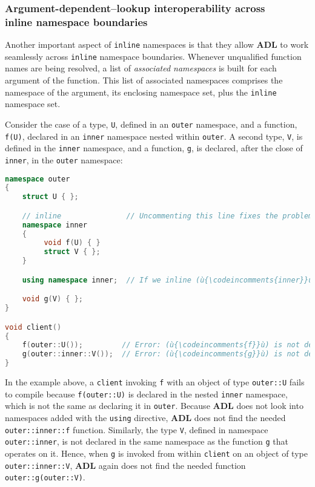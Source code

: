 \subsubsection[Argument-dependent–lookup interoperability across {\tt inline} {\tt namespace} boundaries]{Argument-dependent–lookup interoperability across\\[0.5ex] {\SubsubsecCode inline} {\SubsubsecCode namespace} boundaries}\label{argument-dependent–lookup-interoperability-across-inline-namespace-boundaries}

Another important aspect of \texttt{inline} namespaces is that they
allow \textbf{ADL} to work seamlessly across \texttt{inline} namespace
boundaries. Whenever unqualified function names are being resolved, a
list of \emph{associated namespaces} is built for each argument of the
function. This list of associated namespaces comprises the namespace of the
argument, its enclosing namespace set, plus the \texttt{inline}
namespace set.

Consider the case of a type, \texttt{U}, defined in an \texttt{outer}
namespace, and a function, \texttt{f(U)}, declared in an \texttt{inner}
namespace nested within \texttt{outer}. A second type, \texttt{V}, is
defined in the \texttt{inner} namespace, and a function, \texttt{g}, is
declared, after the close of \texttt{inner}, in the \texttt{outer}
namespace:

\begin{lstlisting}[language=C++]
namespace outer
{
    struct U { };

    // inline               // Uncommenting this line fixes the problem.
    namespace inner
    {
         void f(U) { }
         struct V { };
    }

    using namespace inner;  // If we inline (ù{\codeincomments{inner}}ù), we don't need this line.

    void g(V) { };
}

void client()
{
    f(outer::U());         // Error: (ù{\codeincomments{f}}ù) is not declared in this scope.
    g(outer::inner::V());  // Error: (ù{\codeincomments{g}}ù) is not declared in this scope.
}
\end{lstlisting}

\noindent In the example above, a \texttt{client} invoking \texttt{f} with an
object of type \texttt{outer::U} fails to compile because
\texttt{f(outer::U)} is declared in the nested \texttt{inner} namespace,
which is not the same as declaring it in \texttt{outer}. Because
\textbf{ADL} does not look into namespaces added with the \texttt{using}
directive, \textbf{ADL} does not find the needed
\texttt{outer::inner::f} function. Similarly, the type \texttt{V},
defined in namespace \texttt{outer::inner}, is not declared in the same
namespace as the function \texttt{g} that operates on it. Hence, when
\texttt{g} is invoked from within \texttt{client} on an object of type
\texttt{outer::inner::V}, \textbf{ADL} again does not find the needed
function \texttt{outer::g(outer::V)}.

